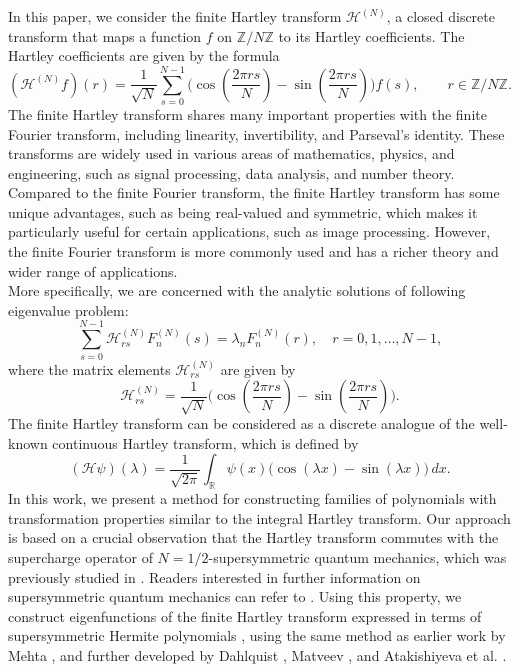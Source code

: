 \documentclass[12 pt]{amsart}
\numberwithin{equation}{section}
\begin{document}
\indent
In this paper, we consider the finite Hartley transform $\mathcal{H}^{(N)}$, a closed discrete transform that maps a function $f$ on $\mathbb{Z}/N\mathbb{Z}$ to its Hartley coefficients. The Hartley coefficients are given by the formula
\begin{equation}
(\mathcal{H}^{(N)}f)(r)=\frac{1}{\sqrt{N}}\sum_{s=0}^{N-1}\big(\cos\left(\frac{2\pi rs}{N}\right)-\sin\left(\frac{2\pi rs}{N}\right)\big)f(s),\qquad r\in\mathbb{Z}/N\mathbb{Z}.
\end{equation}
The finite Hartley transform shares many important properties with the finite Fourier transform, including linearity, invertibility, and Parseval's identity. These transforms are widely used in various areas of mathematics, physics, and engineering, such as signal processing, data analysis, and number theory. Compared to the finite Fourier transform, the finite Hartley transform has some unique advantages, such as being real-valued and symmetric, which makes it particularly useful for certain applications, such as image processing. However, the finite Fourier transform is more commonly used and has a richer theory and wider range of applications.\\  \indent More specifically, we are concerned with the analytic solutions of following eigenvalue problem:
\begin{equation}
\sum_{s=0}^{N-1}\mathcal{H}_{rs}^{(N)}F_n^{(N)}(s) =
\lambda_nF_n^{(N)}(r), \quad r=0,1,\ldots,N-1, \label{1.2}
\end{equation}
where the matrix elements $\mathcal{H}_{rs}^{(N)}$ are given by $$\mathcal{H}_{rs}^{(N)}=\frac{1}{\sqrt{N}}\big(\cos\left(\frac{2\pi rs}{N}\right)-\sin\left(\frac{2\pi rs}{N}\right)\big).$$
The finite Hartley transform can be considered as a discrete analogue of the well-known continuous Hartley transform, which is defined by
$$(\mathscr{H}\psi)(\lambda)=\frac{1}{\sqrt{2\pi}}\int_{\mathbb{R}} \psi(x)\big(\cos(\lambda x)-\sin(\lambda x)\big)\,dx.$$
\indent In this work, we present a method for constructing families of polynomials with transformation properties similar to the integral Hartley transform. Our approach is based on a crucial observation that the Hartley transform commutes with the supercharge operator of $N=1/2$-supersymmetric quantum mechanics, which was previously studied in \cite{S3}. Readers interested in further information on supersymmetric quantum mechanics can refer to \cite{S2,S3}. Using this property, we construct eigenfunctions of the finite Hartley transform expressed in terms of supersymmetric Hermite polynomials \cite{S3}, using the same method as earlier work by Mehta \cite{Mehta}, and further developed by Dahlquist \cite{Dahl}, Matveev \cite{Matv}, and Atakishiyeva et al. \cite{Ata}.
\end{document}
